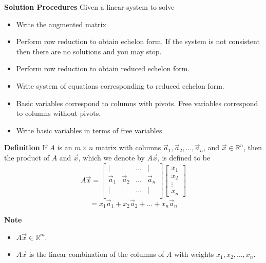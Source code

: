   \begin{frame}[fragile]

\textbf{Solution Procedures} 
Given a linear system to solve
\begin{itemize}
 \item Write the augmented matrix   
 \item Perform row reduction to obtain echelon form.  If the system is not consistent then there are no solutions and you may stop. 
 \item Perform row reduction to obtain reduced echelon form.  
 \item Write system of equations corresponding to reduced echelon form.  
 \item Basic variables correspond to columns with pivots.  Free variables correspond to
 columns without pivots.  
 \item Write basic variables in terms of free variables.
\end{itemize}

\end{frame}


  \begin{frame}[fragile]
\textbf{Definition}
 If $A$ is an $m \times n$ matrix with columns 
 $\vec{a}_1, \vec{a}_2, \dots ,\vec{a}_n$,
and $\vec{x} \in \mathbb R^n$, then the product of $A$ and $\vec{x}$, 
which we denote by $A\vec{x}$, is defined to be 
\[ 
 A \vec{x} = 
 \left[\begin{array}{cccc}
  | & | & \dots & | \\
  \vec{a}_1 & \vec{a}_2 & \dots & \vec{a}_n  \\
  | & | & \dots & | \\
 \end{array}\right]
\left[\begin{array}{r} 
 x_1 \\ x_2 \\ \vdots \\ x_n
\end{array}\right]
\]
\[
 = x_1 \vec{a}_1 + x_2 \vec{a}_2 + \dots + x_n \vec{a}_n
\]


\textbf{Note}
\begin{itemize}
\item $A\vec{x} \in \mathbb R^m$.
\item $A\vec{x}$ is the linear combination of the columns of $A$ with weights $x_1, x_2, \dots, x_n$.
\end{itemize}

\end{frame}

